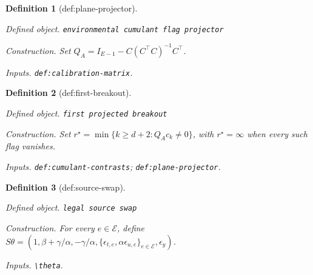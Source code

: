 \documentclass{article}
\newtheorem{definition}{Definition}
\begin{document}
\begin{definition}[def:plane-projector]\label{def:plane-projector}
\par\smallskip\noindent\emph{Defined object.} \texttt{environmental cumulant flag projector}
\par\smallskip\noindent\emph{Construction.} Set \(Q_A=I_{E-1}-C(C^\top C)^{-1}C^\top\).
\par\smallskip\noindent\emph{Inputs.} \texttt{def:\allowbreak{}calibration-\allowbreak{}matrix}.
\end{definition}

\begin{definition}[def:first-breakout]\label{def:first-breakout}
\par\smallskip\noindent\emph{Defined object.} \texttt{first projected breakout}
\par\smallskip\noindent\emph{Construction.} Set \(r^\star=\min\{k\ge d+2:Q_Ac_k\ne0\}\), with \(r^\star=\infty\) when every such flag vanishes.
\par\smallskip\noindent\emph{Inputs.} \texttt{def:\allowbreak{}cumulant-\allowbreak{}contrasts}; \texttt{def:\allowbreak{}plane-\allowbreak{}projector}.
\end{definition}

\begin{definition}[def:source-swap]\label{def:source-swap}
\par\smallskip\noindent\emph{Defined object.} \texttt{legal source swap}
\par\smallskip\noindent\emph{Construction.} For every \(e\in\mathcal E\), define \(S\theta=(1,\beta+\gamma/\alpha,-\gamma/\alpha,\{\epsilon_{t,e},\alpha\epsilon_{u,e}\}_{e\in\mathcal E},\epsilon_y)\).
\par\smallskip\noindent\emph{Inputs.} \texttt{\textbackslash{}\allowbreak{}theta}.
\end{definition}
\end{document}
